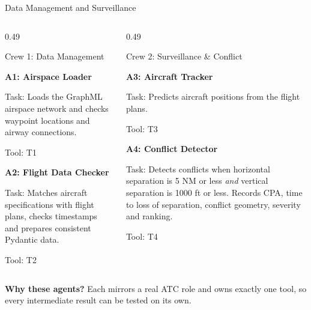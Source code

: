 

\begin{frame}{Data Management and Surveillance}
\small

\begin{columns}[T,onlytextwidth]

\begin{column}{0.49\textwidth}

\begin{block}{Crew 1: Data Management}
\scriptsize

\textbf{A1: Airspace Loader}

\vspace{0.1cm}
Task: Loads the GraphML airspace network and checks waypoint locations and airway connections.

Tool: T1

\vspace{0.3cm}

\textbf{A2: Flight Data Checker}

\vspace{0.1cm}
Task: Matches aircraft specifications with flight plans, checks timestamps and prepares consistent Pydantic data.

Tool: T2

\end{block}

\end{column}

\begin{column}{0.49\textwidth}

\begin{block}{Crew 2: Surveillance \& Conflict}
\scriptsize

\textbf{A3: Aircraft Tracker}

\vspace{0.1cm}
Task: Predicts aircraft positions from the flight plans.

Tool: T3

\vspace{0.3cm}

\textbf{A4: Conflict Detector}

\vspace{0.1cm}
Task: Detects conflicts when horizontal separation is 5 NM or less \emph{and} vertical separation is 1000 ft or less. Records CPA, time to loss of separation, conflict geometry, severity and ranking.

Tool: T4

\end{block}

\end{column}

\end{columns}

\vspace{0.3cm}
\begin{center}
\footnotesize
\textbf{Why these agents?} Each mirrors a real ATC role and owns exactly one tool,
so every intermediate result can be tested on its own.
\end{center}

\end{frame}
